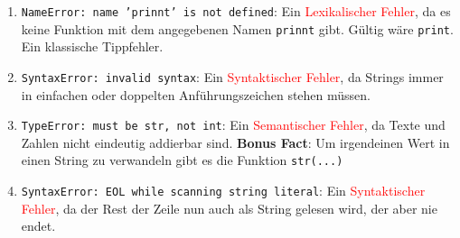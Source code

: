 \begin{enumerate}
	\item \texttt{NameError: name 'prinnt' is not defined}: Ein \textcolor{red}{Lexikalischer Fehler}, da es keine Funktion mit dem angegebenen Namen
		\texttt	{prinnt} gibt. Gültig wäre \texttt{print}. Ein klassische Tippfehler.
	\item \texttt{SyntaxError: invalid syntax}: Ein \textcolor{red}{Syntaktischer Fehler}, da Strings immer in einfachen oder doppelten Anführungszeichen
		stehen müssen.
	\item \texttt{TypeError: must be str, not int}: Ein \textcolor{red}{Semantischer Fehler}, da Texte und Zahlen nicht eindeutig addierbar sind.
		\textbf{Bonus Fact}: Um irgendeinen Wert in einen String zu verwandeln gibt es die Funktion \texttt{str(...)}
	\item \texttt{SyntaxError: EOL while scanning string literal}: Ein \textcolor{red}{Syntaktischer Fehler}, da der Rest der Zeile nun auch als String
		gelesen wird, der aber nie endet.
\end{enumerate}
